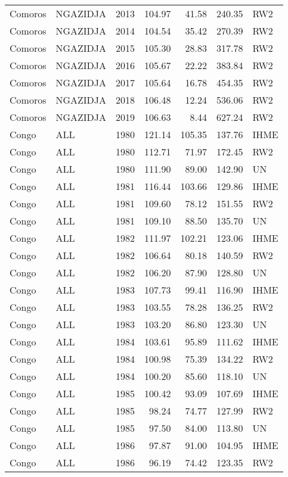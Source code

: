 \begin{longtable}{lllrrrl}
  Comoros & NGAZIDJA & 2013 & 104.97 & 41.58 & 240.35 & RW2 \\ 
  Comoros & NGAZIDJA & 2014 & 104.54 & 35.42 & 270.39 & RW2 \\ 
  Comoros & NGAZIDJA & 2015 & 105.30 & 28.83 & 317.78 & RW2 \\ 
  Comoros & NGAZIDJA & 2016 & 105.67 & 22.22 & 383.84 & RW2 \\ 
  Comoros & NGAZIDJA & 2017 & 105.64 & 16.78 & 454.35 & RW2 \\ 
  Comoros & NGAZIDJA & 2018 & 106.48 & 12.24 & 536.06 & RW2 \\ 
  Comoros & NGAZIDJA & 2019 & 106.63 & 8.44 & 627.24 & RW2 \\ 
  Congo & ALL & 1980 & 121.14 & 105.35 & 137.76 & IHME \\ 
  Congo & ALL & 1980 & 112.71 & 71.97 & 172.45 & RW2 \\ 
  Congo & ALL & 1980 & 111.90 & 89.00 & 142.90 & UN \\ 
  Congo & ALL & 1981 & 116.44 & 103.66 & 129.86 & IHME \\ 
  Congo & ALL & 1981 & 109.60 & 78.12 & 151.55 & RW2 \\ 
  Congo & ALL & 1981 & 109.10 & 88.50 & 135.70 & UN \\ 
  Congo & ALL & 1982 & 111.97 & 102.21 & 123.06 & IHME \\ 
  Congo & ALL & 1982 & 106.64 & 80.18 & 140.59 & RW2 \\ 
  Congo & ALL & 1982 & 106.20 & 87.90 & 128.80 & UN \\ 
  Congo & ALL & 1983 & 107.73 & 99.41 & 116.90 & IHME \\ 
  Congo & ALL & 1983 & 103.55 & 78.28 & 136.25 & RW2 \\ 
  Congo & ALL & 1983 & 103.20 & 86.80 & 123.30 & UN \\ 
  Congo & ALL & 1984 & 103.61 & 95.89 & 111.62 & IHME \\ 
  Congo & ALL & 1984 & 100.98 & 75.39 & 134.22 & RW2 \\ 
  Congo & ALL & 1984 & 100.20 & 85.60 & 118.10 & UN \\ 
  Congo & ALL & 1985 & 100.42 & 93.09 & 107.69 & IHME \\ 
  Congo & ALL & 1985 & 98.24 & 74.77 & 127.99 & RW2 \\ 
  Congo & ALL & 1985 & 97.50 & 84.00 & 113.80 & UN \\ 
  Congo & ALL & 1986 & 97.87 & 91.00 & 104.95 & IHME \\ 
  Congo & ALL & 1986 & 96.19 & 74.42 & 123.35 & RW2 \\ 

\end{longtable}
